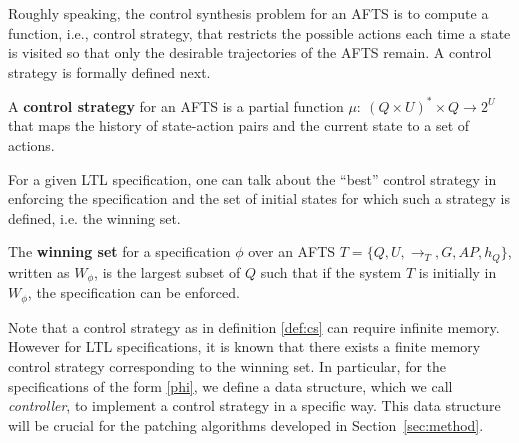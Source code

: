 

Roughly speaking, the control synthesis problem for an AFTS is to compute a function, i.e., control strategy, that restricts the possible actions each time a state is visited so that only the desirable trajectories of the AFTS remain. A control strategy is formally defined next.

\begin{definition}
	A \textbf{control strategy} for an AFTS is a partial function $ \mu:~(Q\times U)^*\times Q\rightarrow 2^U $ that maps the history of state-action pairs and the current state to a set of actions.\label{def:cs}
\end{definition}

For a given LTL specification, one can talk about the ``best'' control strategy in enforcing the specification
and the set of initial states for which such a strategy is defined, i.e. the winning set.

\begin{definition}
	The \textbf{winning set} for a specification $ \phi $ over an AFTS $T = \{Q,U,\rightarrow_T,G,AP,h_Q\}$, written as $ W_{\phi} $, is the largest subset of $ Q $ such that if the system $ T $ is initially in $ W_{\phi} $, the specification can be enforced.\label{def:winset}
\end{definition}

Note that a control strategy as in definition \ref{def:cs} can require infinite memory. However for LTL specifications, it is known that there exists a finite memory control strategy corresponding to the winning set. In particular, for the specifications of the form \eqref{phi}, we define a data structure, which we call \emph{controller}, to implement a control strategy in a specific way. This data structure will be crucial for the patching algorithms developed
in Section~\ref{sec:method}.

